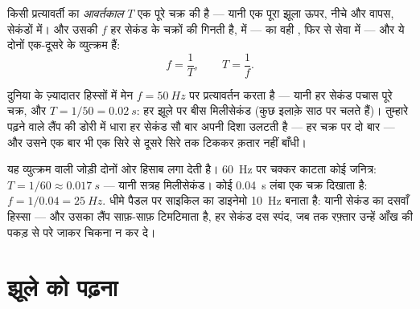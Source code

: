 \begin{definition}[आवर्तकाल और आवृत्ति]\label{def:g9:alternating-current:period}
किसी प्रत्यावर्ती  का \emph{आवर्तकाल} $T$ एक
पूरे चक्र की  है --- यानी एक पूरा झूला ऊपर, नीचे और वापस, सेकंडों
में। और उसकी \emph{} $f$ हर सेकंड के चक्रों की गिनती है,
 में ---  का वही , फिर से सेवा में --- और ये
दोनों एक-दूसरे के व्युत्क्रम हैं:
\[
f = \frac{1}{T}, \qquad T = \frac{1}{f}.
\]
\end{definition}

\begin{proposition}[मेन के ज़रूरी आँकड़े]\label{prop:g9:alternating-current:mains}
दुनिया के ज़्यादातर हिस्सों में मेन $f = \qty{50}{Hz}$ पर प्रत्यावर्तन
करता है --- यानी हर सेकंड पचास पूरे चक्र, और  $T = 1/50 =
\qty{0.02}{s}$: हर झूले पर बीस मिलीसेकंड (कुछ इलाक़े साठ पर चलते हैं)।
तुम्हारे पढ़ने वाले लैंप की डोरी में धारा हर सेकंड सौ बार अपनी दिशा
उलटती है --- हर चक्र पर दो बार --- और उसने एक बार भी एक सिरे से
दूसरे सिरे तक टिककर क़तार नहीं बाँधी।
\end{proposition}

\begin{example}[आवृत्ति का अंकगणित]\label{ex:g9:alternating-current:arithmetic}
यह व्युत्क्रम वाली जोड़ी दोनों ओर हिसाब लगा देती है। \qty{60}{Hz} पर
चक्कर काटता कोई जनित्र: $T = 1/60 \approx \qty{0.017}{s}$ --- यानी
सत्रह मिलीसेकंड। कोई  \qty{0.04}{s} लंबा एक चक्र दिखाता है:
$f = 1/0.04 = \qty{25}{Hz}$. धीमे पैडल पर साइकिल का डाइनेमो
\qty{10}{Hz} बनाता है: यानी  सेकंड का दसवाँ हिस्सा --- और उसका
लैंप साफ़-साफ़ टिमटिमाता है, हर सेकंड दस स्पंद, जब तक रफ़्तार उन्हें
आँख की पकड़ से परे जाकर चिकना न कर दे।
\end{example}

\section{झूले को पढ़ना}

